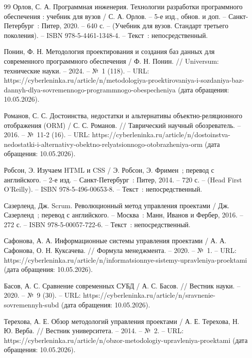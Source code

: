 \begin{thebibliography}{99}
	 Орлов, С. А. Программная инженерия. Технологии разработки программного обеспечения : учебник для вузов / С. А. Орлов. -- 5-е изд., обнов. и доп. -- Санкт-Петербург~: Питер, 2020. -- 640 с. -- (Учебник для вузов. Стандарт третьего поколения). -- ISBN 978-5-4461-1348-4. -- Текст~: непосредственный.

	 Понин, Ф. Н. Методология проектирования и создания баз данных для современного программного обеспечения / Ф. Н. Понин. // Universum: технические науки. -- 2024. -- №~1 (118). -- URL: https://cyberleninka.ru/article/n/metodologiya-proektirovaniya-i-sozdaniya-baz-dannyh-dlya-sovremennogo-programmnogo-obespecheniya (дата обращения: 10.05.2026).

	 Романов, С. С. Достоинства, недостатки и альтернативы объектно-реляционного отображения (ORM) / С. С. Романов. // Таврический научный обозреватель. -- 2016. -- №~11-2 (16). -- URL: https://cyberleninka.ru/article/n/dostoinstva-nedostatki-i-alternativy-obektno-relyatsionnogo-otobrazheniya-orm (дата обращения: 10.05.2026).

	 Робсон, Э. Изучаем HTML и CSS / Э. Робсон, Э. Фримен~; перевод с английского. -- 2-е изд. -- Санкт-Петербург~: Питер, 2014. -- 720 с. -- (Head First O'Reilly). -- ISBN 978-5-496-00653-8. -- Текст~: непосредственный.

	 Сазерленд, Дж. Scrum. Революционный метод управления проектами / Дж. Сазерленд~; перевод с английского. -- Москва~: Манн, Иванов и Фербер, 2016. -- 272 с. -- ISBN 978-5-00057-722-6. -- Текст~: непосредственный.

	 Сафонова, А. А. Информационные системы управления проектами / А. А. Сафонова, О. Н. Куксачева. // Формула менеджмента. -- 2020. -- №~1. -- URL: https://cyberleninka.ru/article/n/informatsionnye-sistemy-upravleniya-proektami (дата обращения: 10.05.2026).

	 Басов, А. С. Сравнение современных СУБД / А. С. Басов. // Вестник науки. -- 2020. -- №~9 (30). -- URL: https://cyberleninka.ru/article/n/sravnenie-sovremennyh-subd (дата обращения: 10.05.2026).

	 Терехова, А. Е. Обзор методологий управления проектами / А. Е. Терехова, Н. Ю. Верба. // Вестник университета. -- 2014. -- №~2. -- URL: https://cyberleninka.ru/article/n/obzor-metodologiy-upravleniya-proektami (дата обращения: 10.05.2026).


\end{thebibliography}
